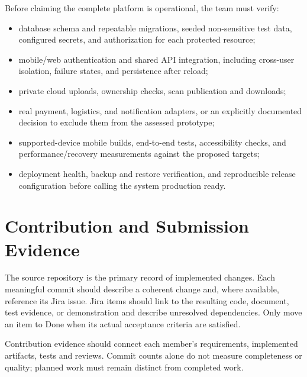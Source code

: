 Before claiming the complete platform is operational, the team must verify:
\begin{itemize}
\item database schema and repeatable migrations, seeded non-sensitive test
data, configured secrets, and authorization for each protected resource;
\item mobile/web authentication and shared API integration, including
cross-user isolation, failure states, and persistence after reload;
\item private cloud uploads, ownership checks, scan publication and downloads;
\item real payment, logistics, and notification adapters, or an explicitly
documented decision to exclude them from the assessed prototype;
\item supported-device mobile builds, end-to-end tests, accessibility checks,
and performance/recovery measurements against the proposed targets;
\item deployment health, backup and restore verification, and reproducible
release configuration before calling the system production ready.
\end{itemize}

\section{Contribution and Submission Evidence}
The source repository is the primary record of implemented changes. Each
meaningful commit should describe a coherent change and, where available,
reference its Jira issue. Jira items should link to the resulting code,
document, test evidence, or demonstration and describe unresolved dependencies.
Only move an item to Done when its actual acceptance criteria are satisfied.

Contribution evidence should connect each member's requirements, implemented
artifacts, tests and reviews. Commit counts alone do not measure completeness
or quality; planned work must remain distinct from completed work.
